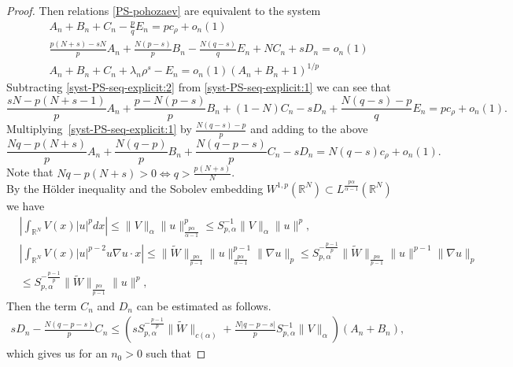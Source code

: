 \documentclass[11pt,reqno]{amsart}
\theoremstyle{definition}
\numberwithin{equation}{section}
\numberwithin{theorem}{section}
\numberwithin{equation}{section}
\numberwithin{theorem}{section}
\newcommand{\rn}{\mathbb{R}^N}
\begin{document}
\begin{proof}
Then relations \eqref{PS-pohozaev} are equivalent to the system
\begin{subequations}
\begin{align}
&A_n+B_n+C_n-\frac{p}{q}E_n=p c_{\rho}+o_n(1) \label{syst-PS-seq-explicit:1}\\
&\frac{p(N+s)-sN}{p}A_n+\frac{N(p-s)}{p}B_n-\frac{N(q-s)}{q}E_n+N C_n+sD_n=o_n(1)\label{syst-PS-seq-explicit:2}\\
&A_n+B_n+C_n+\lambda_n\rho^s-E_n=o_n(1)(A_n+B_n+1)^{1/p}%
\label{syst-PS-seq-explicit:3}
\end{align}
\label{syst-PS-seq-explicit}
\end{subequations} 
Subtracting \eqref{syst-PS-seq-explicit:2} from \eqref{syst-PS-seq-explicit:1} we can see that
$$\frac{sN-p(N+s-1)}{p}A_n+\frac{p-N(p-s)}{p}B_n+(1-N)C_n-sD_n+\frac{N(q-s)-p}{q}E_n=pc_{\rho}+o_n(1).$$
Multiplying~\eqref{syst-PS-seq-explicit:1} by $\frac{N(q-s)-p}{p}$ and adding to the above
\begin{equation}
\label{rel-bd}
\frac{Nq-p(N+s)}{p}A_n+\frac{N(q-p)}{p}B_n+\frac{N(q-p-s)}{p}C_n-sD_n=N(q-s)c_{\rho}+o_n(1).
\end{equation}
Note that $Nq-p(N+s)>0\Leftrightarrow q>\frac{p(N+s)}{N}$.\\
By the H\"{o}lder inequality and the Sobolev embedding $W^{1,p}(\rn)\subset L^{\frac{p\alpha}{\alpha-1}}(\rn)$ we have
\begin{equation}
\label{est-CD}
\begin{aligned}
&\left|\int_{\rn}V(x)|u|^p dx\right|\le \|V\|_{\alpha}\|u\|_{\frac{p\alpha}{\alpha-1}}^p\le S_{p,\alpha}^{-1}\|V\|_{\alpha}\|u\|^p,\\
&\left|\int_{\rn}V(x)|u|^{p-2}u\nabla u\cdotp x\right|\le\|\tilde{W}\|_{\frac{p\alpha}{p-1}}\|u\|_{\frac{p\alpha}{\alpha-1}}^{p-1}\|\nabla u\|_p
\le S_{p,\alpha}^{-\frac{p-1}{p}}\|\tilde{W}\|_{\frac{p\alpha}{p-1}}
\|u\|^{p-1}\|\nabla u\|_p\\
&\le S_{p,\alpha}^{-\frac{p-1}{p}}\|\tilde{W}\|_{\frac{p\alpha}{p-1}}\|u\|^p,  
\end{aligned}    
\end{equation}
Then the term $C_n$ and $D_n$ can be estimated as follows.
\begin{align*}
    sD_n - \frac{N(q-p-s)}{p}C_n
    \le\left( s S_{p,\alpha}^{-\frac{p-1}{p}}\|\tilde{W}\|_{c(\alpha)} 
    + \frac{N|q-p-s|}{p} S_{p,\alpha}^{-1}\|V\|_{\alpha}\right)(A_n+B_n),
\end{align*}
which gives us for an $n_0>0$ such that

\end{proof}
\end{document}
